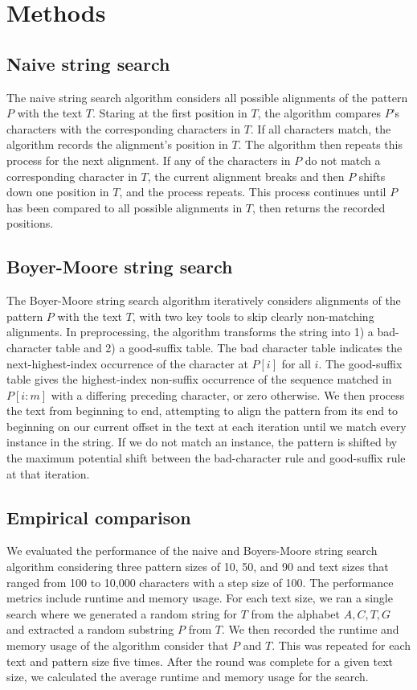 \documentclass[11pt, letterpaper]{article}
\begin{document}

\section{Methods}

\subsection{Naive string search}
The naive string search algorithm considers all possible alignments of the
pattern $P$ with the text $T$. Staring at the first position in $T$, the
algorithm compares $P$'s characters with the corresponding characters in $T$.
If all characters match, the algorithm records the alignment's position in $T$.
The algorithm then repeats this process for the next alignment. If any of the 
characters in $P$ do not match a corresponding character in $T$, the current
alignment breaks and then $P$ shifts down one position in $T$, and the process
repeats. This process continues until $P$ has been compared to all possible
alignments in $T$, then returns the recorded positions.

\subsection{Boyer-Moore string search}
The Boyer-Moore string search algorithm iteratively considers alignments of the
pattern $P$ with the text $T$, with two key tools to skip clearly non-matching alignments. In preprocessing, the algorithm transforms the string into 1) a bad-character table and 2) a good-suffix table. The bad character table indicates the next-highest-index occurrence of the character at $P[i]$ for all $i$. The good-suffix table gives the highest-index non-suffix occurrence of the sequence matched in $P[i:m]$ with a differing preceding character, or zero otherwise. We then process the text from beginning to end, attempting to align the pattern from its end to beginning on our current offset in the text at each iteration until we match every instance in the string. If we do not match an instance, the pattern is shifted by the maximum potential shift between the bad-character rule and good-suffix rule at that iteration.

\subsection{Empirical comparison}

We evaluated the performance of the naive and Boyers-Moore string search algorithm considering three pattern sizes of 10, 50, and 90 and text sizes that ranged from 100 to 10,000 characters with a step size of 100.  The performance metrics include runtime and memory usage. For each text size, we ran a single search where we generated a random string for $T$ from the alphabet ${A, C, T, G}$ and extracted a random substring $P$ from $T$. We then recorded the runtime and memory usage of the algorithm consider that $P$ and $T$. This was repeated for each text and pattern size five times. After the round was complete for a given text size, we calculated the average runtime and memory usage for the search.
\end{document}
